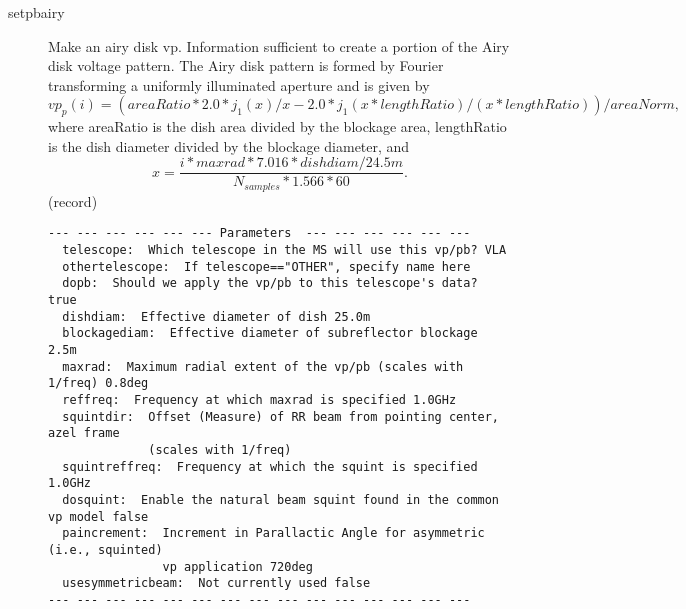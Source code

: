 \documentclass[12pt]{article}
\begin{document}
\begin{description}
 
  \item[setpbairy]
   Make an airy disk vp.   
   Information sufficient to create a portion of the Airy disk voltage pattern.
   The Airy disk pattern is formed by Fourier transforming a uniformly illuminated
   aperture and is given by
   \begin{equation}
     vp_p(i) = ( areaRatio * 2.0 * j_{1}(x)/x 
     - 2.0 * j_{1}(x*lengthRatio)/(x*lengthRatio) )/ areaNorm,
   \end{equation}
   where areaRatio is the dish area divided by the blockage area, lengthRatio
   is the dish diameter divided by the blockage diameter, and 
   \begin{equation}
     x = \frac{i * maxrad * 7.016 * dishdiam/24.5m}{N_{samples} * 1.566 * 60}.
   \end{equation}
   (record)
 
{\small
\begin{verbatim}
--- --- --- --- --- --- Parameters  --- --- --- --- --- ---
  telescope:  Which telescope in the MS will use this vp/pb? VLA 
  othertelescope:  If telescope=="OTHER", specify name here 
  dopb:  Should we apply the vp/pb to this telescope's data? true 
  dishdiam:  Effective diameter of dish 25.0m 
  blockagediam:  Effective diameter of subreflector blockage 2.5m 
  maxrad:  Maximum radial extent of the vp/pb (scales with 1/freq) 0.8deg 
  reffreq:  Frequency at which maxrad is specified 1.0GHz 
  squintdir:  Offset (Measure) of RR beam from pointing center, azel frame 
              (scales with 1/freq) 
  squintreffreq:  Frequency at which the squint is specified 1.0GHz 
  dosquint:  Enable the natural beam squint found in the common vp model false 
  paincrement:  Increment in Parallactic Angle for asymmetric (i.e., squinted) 
                vp application 720deg 
  usesymmetricbeam:  Not currently used false 
--- --- --- --- --- --- --- --- --- --- --- --- --- --- ---
\end{verbatim} 
} 



\end{description}
\end{document}
